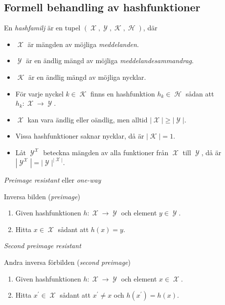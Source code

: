\documentclass{beamer}
\theoremstyle{definition}
\DeclareMathOperator{\K}{\mathcal{K}}
\DeclareMathOperator{\X}{\mathcal{X}}
\DeclareMathOperator{\Y}{\mathcal{Y}}
\DeclareMathOperator{\h}{\mathcal{H}}
\let\H\h
\begin{document}
\subsection{Formell behandling av hashfunktioner}
\begin{frame}{\insertsubsectionhead}
  \begin{definition}
    En \emph{hashfamilj} är en tupel \((\X, \Y, \K, \H)\), där
    \begin{itemize}
      \item \(\X\) är mängden av möjliga \emph{meddelanden}.
      \item \(\Y\) är en ändlig mängd av möjliga \emph{meddelandesammandrag}.
      \item \(\K\) är en ändlig mängd av möjliga nycklar.
      \item För varje nyckel \(k\in \K\) finns en hashfunktion \(h_k\in \H\) 
        sådan att \(h_k\colon \X\to \Y\).
    \end{itemize}
  \end{definition}
\end{frame}
\begin{frame}{\insertsubsectionhead}
  \begin{itemize}
    \item \(\X\) kan vara ändlig eller oändlig, men alltid \(|\X|\geq |\Y|\).
    \item Vissa hashfunktioner saknar nycklar, då är \(|\K| = 1\).
    \item Låt \(\Y^{\X}\) beteckna mängden av alla funktioner från \(\X\) till 
      \(\Y\), då är \(|\Y^{\X}| = |\Y|^{|\X|}\).
  \end{itemize}
\end{frame}
\begin{frame}{\insertsubsectionhead}{\emph{Preimage resistant} eller 
  \emph{one-way}}
  \begin{block}{Inversa bilden (\emph{preimage})}
    \begin{enumerate}
      \item Given hashfunktionen \(h\colon \X\to \Y\) och element \(y\in \Y\).
      \item Hitta \(x\in \X\) sådant att \(h(x) = y\).
    \end{enumerate}
  \end{block}
  \begin{figure}
  \end{figure}
\end{frame}
\begin{frame}{\insertsubsectionhead}{\emph{Second preimage resistant}}
  \begin{block}{Andra inversa förbilden (\emph{second preimage})}
    \begin{enumerate}
      \item Given hashfunktionen \(h\colon \X\to \Y\) och element \(x\in \X\).
      \item Hitta \(x^\prime\in \X\) sådant att \(x^\prime\neq x\) och 
        \(h(x^\prime) = h(x)\).
    \end{enumerate}
  \end{block}
\end{frame}
\end{document}

